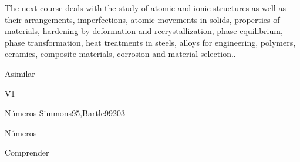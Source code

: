 \begin{syllabus}


\begin{justification}
The next course deals with the study of atomic and ionic structures as well as their
arrangements, imperfections, atomic movements in solids, properties of materials,
hardening by deformation and recrystallization, phase equilibrium, phase
transformation, heat treatments in steels, alloys for engineering, polymers, ceramics,
composite materials, corrosion and material selection.. 
\end{justification}

\begin{goals}
\item Asimilar
\end{goals}

\begin{outcomes}{V1}
   \item {}
   \item {}
   \item {}
\end{outcomes}

\begin{unit}{Números }{}{Simmons95,Bartle99}{20}{3}
   \begin{topics}
      \item Números 
   \end{topics}

   \begin{learningoutcomes}
      \item Comprender 
      \end{learningoutcomes}
\end{unit}

\begin{coursebibliography}
\end{coursebibliography}

\end{syllabus}
